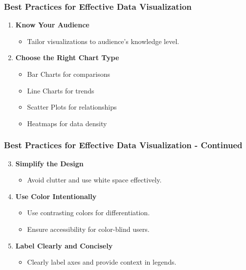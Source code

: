 \documentclass[aspectratio=169]{beamer}
\begin{document}
\begin{frame}[fragile]
    \frametitle{Best Practices for Effective Data Visualization}
    \begin{enumerate}
        \item \textbf{Know Your Audience}
        \begin{itemize}
            \item Tailor visualizations to audience's knowledge level.
        \end{itemize}
        
        \item \textbf{Choose the Right Chart Type}
        \begin{itemize}
            \item Bar Charts for comparisons
            \item Line Charts for trends
            \item Scatter Plots for relationships
            \item Heatmaps for data density
        \end{itemize}
    \end{enumerate}
\end{frame}

\begin{frame}[fragile]
    \frametitle{Best Practices for Effective Data Visualization - Continued}
    \begin{enumerate}
        \setcounter{enumi}{2}
        \item \textbf{Simplify the Design}
        \begin{itemize}
            \item Avoid clutter and use white space effectively.
        \end{itemize}

        \item \textbf{Use Color Intentionally}
        \begin{itemize}
            \item Use contrasting colors for differentiation.
            \item Ensure accessibility for color-blind users.
        \end{itemize}

        \item \textbf{Label Clearly and Concisely}
        \begin{itemize}
            \item Clearly label axes and provide context in legends.
        \end{itemize}
    \end{enumerate}
\end{frame}
\end{document}

